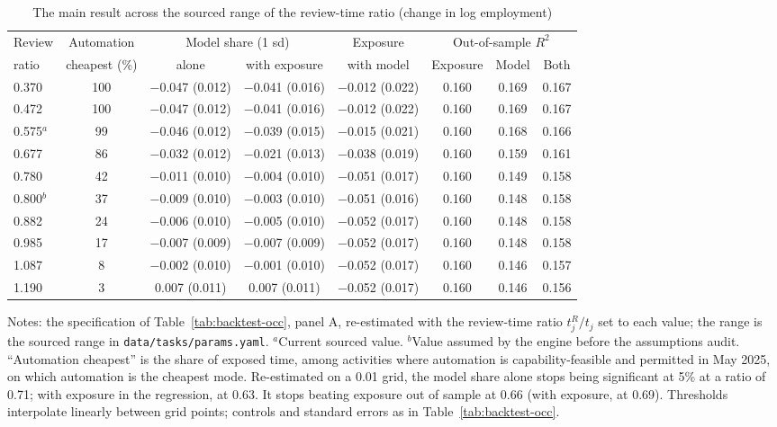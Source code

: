\begin{table}[tbp]
\centering
\caption{The main result across the sourced range of the review-time ratio (change in log employment)}\label{tab:backtest-sweep}
\footnotesize
\setlength{\tabcolsep}{4pt}
\begin{tabular}{@{}lccccccc@{}}
\toprule
Review & Automation & \multicolumn{2}{c}{Model share (1 sd)} & Exposure & \multicolumn{3}{c}{Out-of-sample $R^2$}\\
\cmidrule(lr){3-4}\cmidrule(lr){6-8}
ratio & cheapest (\%) & alone & with exposure & with model & Exposure & Model & Both\\
\midrule
0.370 & 100 & $-$0.047 (0.012) & $-$0.041 (0.016) & $-$0.012 (0.022) & 0.160 & 0.169 & 0.167\\
0.472 & 100 & $-$0.047 (0.012) & $-$0.041 (0.016) & $-$0.012 (0.022) & 0.160 & 0.169 & 0.167\\
0.575$^{a}$ & 99 & $-$0.046 (0.012) & $-$0.039 (0.015) & $-$0.015 (0.021) & 0.160 & 0.168 & 0.166\\
0.677 & 86 & $-$0.032 (0.012) & $-$0.021 (0.013) & $-$0.038 (0.019) & 0.160 & 0.159 & 0.161\\
0.780 & 42 & $-$0.011 (0.010) & $-$0.004 (0.010) & $-$0.051 (0.017) & 0.160 & 0.149 & 0.158\\
0.800$^{b}$ & 37 & $-$0.009 (0.010) & $-$0.003 (0.010) & $-$0.051 (0.016) & 0.160 & 0.148 & 0.158\\
0.882 & 24 & $-$0.006 (0.010) & $-$0.005 (0.010) & $-$0.052 (0.017) & 0.160 & 0.148 & 0.158\\
0.985 & 17 & $-$0.007 (0.009) & $-$0.007 (0.009) & $-$0.052 (0.017) & 0.160 & 0.148 & 0.158\\
1.087 & 8 & $-$0.002 (0.010) & $-$0.001 (0.010) & $-$0.052 (0.017) & 0.160 & 0.146 & 0.157\\
1.190 & 3 & 0.007 (0.011) & 0.007 (0.011) & $-$0.052 (0.017) & 0.160 & 0.146 & 0.156\\
\bottomrule
\end{tabular}
\smallskip
\begin{minipage}{0.97\linewidth}\footnotesize
Notes: the specification of Table~\ref{tab:backtest-occ}, panel A, re-estimated with the review-time ratio $t^R_j/t_j$ set to each value; the range is the sourced range in \texttt{data/\allowbreak tasks/\allowbreak params.yaml}. $^{a}$Current sourced value. $^{b}$Value assumed by the engine before the assumptions audit. ``Automation cheapest'' is the share of exposed time, among activities where automation is capability-feasible and permitted in May 2025, on which automation is the cheapest mode. Re-estimated on a 0.01 grid, the model share alone stops being significant at 5\% at a ratio of 0.71; with exposure in the regression, at 0.63. It stops beating exposure out of sample at 0.66 (with exposure, at 0.69). Thresholds interpolate linearly between grid points; controls and standard errors as in Table~\ref{tab:backtest-occ}.
\end{minipage}
\end{table}
